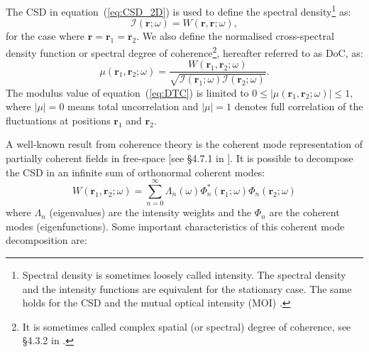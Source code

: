 \documentclass[preprint]{iucr}
\newcommand{\inred}[1]{{\color{red}#1}}
\begin{document}
The CSD in equation~(\ref{eq:CSD_2D}) is used to define the spectral density\footnote{Spectral density is sometimes loosely called intensity. The spectral density and the intensity functions are equivalent for the 
stationary case. The same holds for the CSD and the mutual optical intensity (MOI) \cite{mandel_wolf}.} as:
\begin{equation}\label{eq:intensity}
    \mathcal{I}(\textbf{r};\omega)=W(\textbf{r},\textbf{r};\omega),
\end{equation}
for the case where $\textbf{r}=\textbf{r}_1=\textbf{r}_2$. We also define the normalised cross-spectral density function or spectral degree of coherence\footnote{It is sometimes called complex spatial (or spectral) degree of coherence, see §4.3.2 in \cite{mandel_wolf}.}, hereafter referred \inred{to} as DoC, as:
\begin{equation}
\mu(\textbf{r}_1,\textbf{r}_2;\omega) = \frac{W(\textbf{r}_1,\textbf{r}_2;\omega)}{\sqrt{\mathcal{I}(\textbf{r}_1;\omega) \mathcal{I}(\textbf{r}_2;\omega)}}.
\label{eq:DTC}
\end{equation}
The modulus value of equation~(\ref{eq:DTC}) is limited to $0\leq|\mu(\textbf{r}_1,\textbf{r}_2;\omega)|\leq 1$, where $|\mu|=0$ means total uncorrelation and $|\mu|=1$ denotes full correlation of the fluctuations at positions $\textbf{r}_1$ and $\textbf{r}_2$. 

A well\inred{-}known result from coherence theory is the coherent mode representation of partially coherent fields in free-space [see §4.7.1 in \cite{mandel_wolf}]. It is possible to decompose the CSD in an infinite sum of orthonormal coherent modes:
\begin{equation}\label{eq:W2DCMD}
W(\textbf{r}_1,\textbf{r}_2;\omega) = \sum_{n=0}^{\infty} \Lambda_n(\omega) \Phi_{n}^*(\textbf{r}_1;\omega) \Phi_{n}(\textbf{r}_2;\omega)
\end{equation}
where $\Lambda_n$ (eigenvalues) are the intensity weights and the $\Phi_n$ are the coherent modes (eigenfunctions). 
Some important characteristics of this coherent mode decomposition are: 
\end{document}
